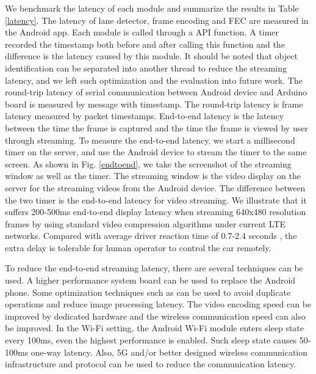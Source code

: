 We benchmark the latency of each module and summarize the 
results in Table \ref{latency}. 
The latency of lane detector, frame encoding and FEC are measured
in the Android app. 
Each module is called through a API function. 
A timer recorded the timestamp both before and after calling this function and 
the difference is the latency caused by this module. 
It should be noted that object identification can be separated 
into another thread to reduce the streaming latency, 
and we left such optimization and the evaluation into future work.  
The round-trip latency of serial communication between Android device and 
Arduino board is measured by message with timestamp.  
The round-trip latency is frame latency measured by packet timestamps. 
End-to-end latency is the latency between the time the frame is captured
and the time the frame is viewed by user through streaming. 
To measure the end-to-end latency, we start a millisecond timer
on the server, and use the Android device to stream the 
timer to the same screen. 
As shown in Fig. \ref{endtoend}, we take the screenshot of 
the streaming window as well as the timer.
The streaming window is the video display on the server for the
streaming videos from the Android device. 
The difference between the two timer is the end-to-end latency
for video streaming.  
We illustrate that it suffers 200-500ms end-to-end display latency 
when streaming 640x480 resolution frames by using
standard video compression algorithms \cite{marpe2006h}
under current LTE networks. 
Compared with average driver reaction time of 0.7-2.4 seconds \cite{taoka1989brake}, 
the extra delay is tolerable for human operator
to control the car remotely.  

To reduce the end-to-end streaming latency, there are several techniques 
can be used. 
A higher performance system board can be used to replace the Android phone. 
Some optimization techniques such as \cite{likamwa2015starfish} can be used
to avoid duplicate operations and reduce image processing latency. 
The video encoding speed can be improved by dedicated hardware and
the wireless communication speed can also be improved. 
In the Wi-Fi setting, the Android Wi-Fi module enters sleep state
every 100ms, even the highest performance is enabled. 
Such sleep state causes 50-100ms one-way latency. 
Also, 5G and/or better designed wireless communication infrastructure and protocol
can be used to reduce the communication latency. 



